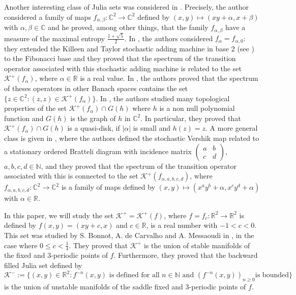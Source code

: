 \documentclass[11pt]{amsart}
\theoremstyle{definition}
\begin{document}
Another interesting class of Julia sets was considered in \cite{g}. Precisely, the author considered a family of maps $f_{\alpha,\beta}:\mathbb{C}^2\longrightarrow\mathbb{C}^2$ defined by $(x,y)\mapsto(xy+\alpha,x+\beta)$ with $\alpha,\beta\in\mathbb{C}$ and he proved, among other things, that the family $f_{\alpha,\beta}$ have a measure of the maximal entropy $\frac{1+\sqrt{5}}{2}$.  In \cite{ms}, the authors considered $f_\alpha=f_{\alpha,0}$: they  extended the Killeen and Taylor stochastic adding machine in base $2$ (see \cite{killentaylor}) to the Fibonacci base and they proved that the spectrum of the transition operator associated with this stochastic adding machine is related to the set $\mathcal{K}^+(f_\alpha)$, where $\alpha\in\mathbb{R}$ is a real value. In \cite{am}, the authors proved that the spectrum of theses operators in other Banach spaces contains the set $\{z\in\mathbb{C}^2:(z,z)\in\mathcal{K}^+(f_\alpha)\}$. In \cite{abms}, the authors studied many topological properties of the set $\mathcal{K}^+(f_\alpha)\cap G(h)$ where $h$ is a non null polynomial function and $G(h)$ is the graph of $h$ in $\mathbb{C}^2$. In particular, they proved that $\mathcal{K}^+(f_\alpha)\cap G(h)$ is a quasi-disk, if $|\alpha|$ is small and $h(z)=z$. A more general class is given in \cite{cmv}, where the authors defined  the stochastic Vershik map related to a stationary ordered Bratteli diagram with incidence matrix $\left(\begin{array}{cc} a & b \\ c & d\end{array} \right)$, $a,b,c,d\in\mathbb{N}$, and they proved that the spectrum of the transition operator associated with this is connected to the set $\mathcal{K}^+(f_{\alpha,a,b,c,d})$, where $f_{\alpha,a,b,c,d}:\mathbb{C}^2\longrightarrow\mathbb{C}^2$ is a family of maps defined by $(x,y)\mapsto(x^ay^b+\alpha,x^cy^d+\alpha)$ with $\alpha\in\mathbb{R}$.



In this paper, we will study the set $\mathcal{K}^+=\mathcal{K}^+(f)$, where
$f=f_c:\mathbb{R}^2\longrightarrow\mathbb{R}^2$ is defined by
$f(x,y)=(xy+c,x)$ and $c\in\mathbb{R}$, is a real number with $-1<c<0$.
This set was studied by S. Bonnot, A. de Carvalho and A.
Messaoudi in \cite{bcm}, in the case where $0\leq c<\frac{1}{4}$. They proved that
$\mathcal{K}^+$ is the union of stable manifolds of the fixed and $3$-periodic points of $f$. Furthermore,
they proved that the backward filled Julia set defined by
$\mathcal{K}^-:=\{(x,y)\in\mathbb{R}^2:f^{-n}(x,y) \textrm{ is defined for all } n\in\mathbb{N} \textrm{ and } (f^{-n}(x,y))_{n\geq 0} \textrm{
	is bounded}\}$ is the union of unstable manifolds of the saddle fixed and $3$-periodic points of $f$.
\end{document}
